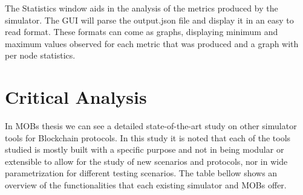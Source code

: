 The Statistics window aids in the analysis of the metrics produced by the simulator.
The GUI will parse the output.json file and display it in an easy to read format.
These formats can come as graphs, displaying minimum and maximum values observed
for each metric that was produced and a graph with per node statistics.

\section{Critical Analysis}
\label{sub:membership_protocols}

In MOBs thesis we can see a detailed state-of-the-art study on other simulator
tools for Blockchain protocols. In this study it is noted that each of the tools
studied is mostly built with a specific purpose and not in being modular or extensible
to allow for the study of new scenarios and protocols,
nor in wide parametrization for different testing scenarios. The table bellow shows an
overview of the functionalities that each existing simulator and MOBs offer.

